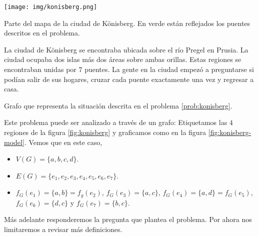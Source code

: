 \begin{prob}\label{prob:konisberg}

    \begin{marginfigure}
        \centering
        \texttt{[image: img/konisberg.png]}
        \caption{Parte del mapa de la ciudad de Könisberg. En verde están reflejados los puentes descritos en el problema.}
        \label{fig:konisberg}
    \end{marginfigure}
    
    La ciudad de Könisberg se encontraba ubicada sobre el río Pregel en Prusia. La ciudad ocupaba dos islas más dos áreas sobre ambas orillas. Estas regiones se encontraban unidas por $7$ puentes. La gente en la ciudad empezó a preguntarse si podían salir de sus hogares, cruzar cada puente exactamente una vez y regresar a casa.
    
    \begin{marginfigure}
        \centering
        \caption{Grafo que representa la situación descrita en el problema \ref{prob:konisberg}.}
        \label{fig:konisberg-model}
    \end{marginfigure}
    
    Este problema puede ser analizado a través de un grafo: Etiquetamos las $4$ regiones de la figura \ref{fig:konisberg} y graficamos como en la figura \ref{fig:konisberg-model}. Vemos que en este caso,
    
    \begin{itemize}
        \item $V(G) = \{a, b, c, d\}$.
        \item $E(G) = \{e_1, e_2, e_3, e_4, e_5, e_6, e_7\}$.
        \item $f_G(e_1) = \{a,b\} = f_g(e_2)$, $f_G(e_3) = \{a,c\}$, $f_G(e_4) = \{a,d\} = f_G(e_5)$, $f_G(e_6) = \{d,c\}$ y $f_G(e_7) = \{b,c\}$.
    \end{itemize}
    
    Más adelante responderemos la pregunta que plantea el problema. Por ahora nos limitaremos a revisar más definiciones.
\end{prob}

